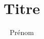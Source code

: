 \documentclass{greyc}
\title{Titre}
\author{Prénom}{Nom}
\date{}
\begin{document}
\frontmatter
\maketitle

\tableofcontents
\mainmatter


\backmatter
\renewcommand{\bibname}{Références Bibliographiques} %

\end{document}
